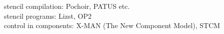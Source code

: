 stencil compilation: Pochoir, PATUS etc.\\
stencil programs: Lizst, OP2\\
control in components: X-MAN (The New Component Model), STCM